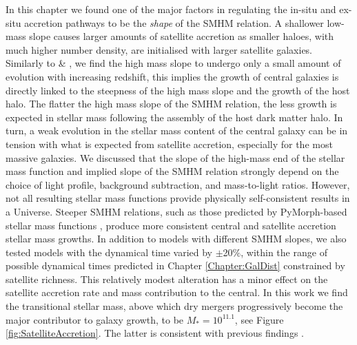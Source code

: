 In this chapter we found one of the major factors in regulating the in-situ and ex-situ accretion pathways to be the \textit{shape} of the SMHM relation. A shallower low-mass slope causes larger amounts of satellite accretion as smaller haloes, with much higher number density, are initialised with larger satellite galaxies. Similarly to \citet{Shankar2006NewFormation} \& \citet{Moster2018Emerge10}, we find the high mass slope to undergo only a small amount of evolution with increasing redshift, this implies the growth of central galaxies is directly linked to the steepness of the high mass slope and the growth of the host halo. The flatter the high mass slope of the SMHM relation, the less growth is expected in stellar mass following the assembly of the host dark matter halo. In turn, a weak evolution in the stellar mass content of the central galaxy can be in tension with what is expected from satellite accretion, especially for the most massive galaxies. We discussed that the slope of the high-mass end of the stellar mass function and implied slope of the SMHM relation strongly depend on the choice of light profile, background subtraction, and mass-to-light ratios. However, not all resulting stellar mass functions provide physically self-consistent results in a \LCDM Universe. Steeper SMHM relations, such as those predicted by PyMorph-based stellar mass functions \citep{Bernardi2013TheProfile}, produce more consistent central and satellite accretion stellar mass growths. In addition to models with different SMHM slopes, we also tested models with the dynamical time varied by $\pm$20$\%$, within the range of possible dynamical times predicted in Chapter \ref{Chapter:GalDist} constrained by satellite richness. This relatively modest alteration has a minor effect on the satellite accretion rate and mass contribution to the central. In this work we find the transitional stellar mass, above which dry mergers progressively become the major contributor to galaxy growth, to be $M_{*} = 10^{11.1}$, see Figure \ref{fig:SatelliteAccretion}. The latter is consistent with previous findings \citep[e.g.,][]{Bernardi2011EvidenceRelations, Cappellari2013EffectEvolution, Shankar2013SizeUniverse}.

